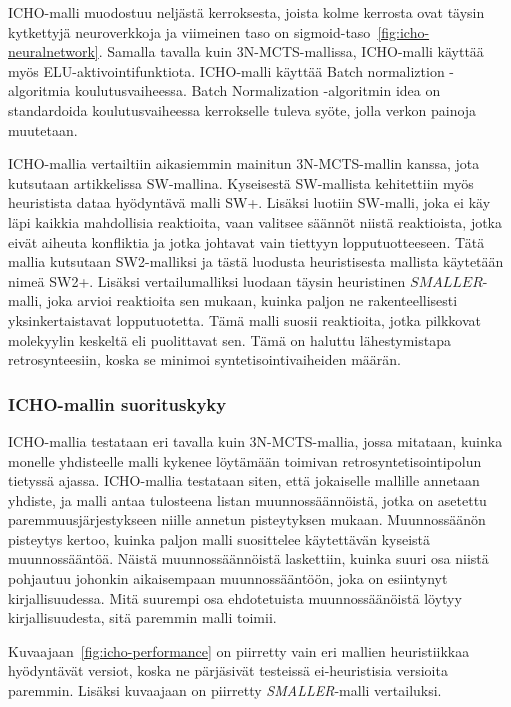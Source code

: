 \documentclass[finnish,twoside,censored,tkt,sw-line]{HYthesisML}
\begin{document}
ICHO-malli muodostuu neljästä kerroksesta, joista kolme kerrosta ovat täysin kytkettyjä neuroverkkoja ja viimeinen taso on sigmoid-taso~\ref{fig:icho-neuralnetwork}.
Samalla tavalla kuin 3N-MCTS-mallissa, ICHO-malli käyttää myös ELU-aktivointifunktiota.
ICHO-malli käyttää Batch normaliztion -algoritmia koulutusvaiheessa.
Batch Normalization -algoritmin idea on standardoida koulutusvaiheessa kerrokselle tuleva syöte, jolla verkon painoja muutetaan.

ICHO-mallia vertailtiin aikasiemmin mainitun 3N-MCTS-mallin kanssa, jota kutsutaan artikkelissa SW-mallina.
Kyseisestä SW-mallista kehitettiin myös heuristista dataa hyödyntävä malli SW+.
Lisäksi luotiin SW-malli, joka ei käy läpi kaikkia mahdollisia reaktioita, vaan valitsee säännöt niistä reaktioista, jotka eivät aiheuta konfliktia ja jotka johtavat vain tiettyyn lopputuotteeseen.
Tätä mallia kutsutaan SW2-malliksi ja tästä luodusta heuristisesta mallista käytetään nimeä SW2+.
Lisäksi vertailumalliksi luodaan täysin heuristinen \(SMALLER\)-malli, joka arvioi reaktioita sen mukaan, kuinka paljon ne rakenteellisesti yksinkertaistavat lopputuotetta.
Tämä malli suosii reaktioita, jotka pilkkovat molekyylin keskeltä eli puolittavat sen.
Tämä on haluttu lähestymistapa retrosynteesiin, koska se minimoi syntetisointivaiheiden määrän.

\subsubsection{ICHO-mallin suorituskyky}

ICHO-mallia testataan eri tavalla kuin 3N-MCTS-mallia, jossa mitataan, kuinka monelle yhdisteelle malli kykenee löytämään toimivan retrosyntetisointipolun tietyssä ajassa.
ICHO-mallia testataan siten, että jokaiselle mallille annetaan yhdiste, ja malli antaa tulosteena listan muunnossäännöistä, jotka on asetettu paremmuusjärjestykseen niille annetun pisteytyksen mukaan.
Muunnossäänön pisteytys kertoo, kuinka paljon malli suosittelee käytettävän kyseistä muunnossääntöä.
Näistä muunnossäännöistä laskettiin, kuinka suuri osa niistä pohjautuu johonkin aikaisempaan muunnossääntöön, joka on esiintynyt kirjallisuudessa.
Mitä suurempi osa ehdotetuista muunnossäänöistä löytyy kirjallisuudesta, sitä paremmin malli toimii.

Kuvaajaan~\ref{fig:icho-performance} on piirretty vain eri mallien heuristiikkaa hyödyntävät versiot, koska ne pärjäsivät testeissä ei-heuristisia versioita paremmin.
Lisäksi kuvaajaan on piirretty \emph{SMALLER}-malli vertailuksi.
\end{document}
